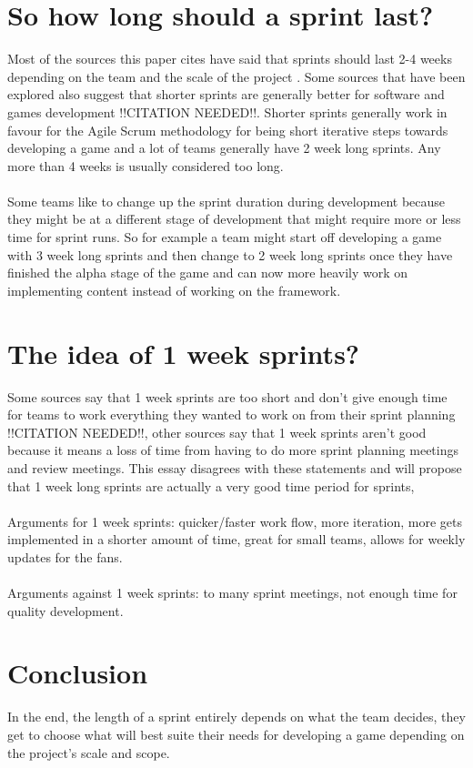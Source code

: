 \documentclass{scrartcl}
\begin{document}
\section{So how long should a sprint last?}
Most of the sources this paper cites have said that sprints should last 2-4 weeks depending on the team and the scale of the project \cite{two} \cite{three} \cite{four} \cite{five}. Some sources that have been explored also suggest that shorter sprints are generally better for software and games development !!CITATION NEEDED!!. Shorter sprints generally work in favour for the Agile Scrum methodology for being short iterative steps towards developing a game and a lot of teams generally have 2 week long sprints. Any more than 4 weeks is usually considered too long.
\\~\\
Some teams like to change up the sprint duration during development because they might be at a different stage of development that might require more or less time for sprint runs. So for example a team might start off developing a game with 3 week long sprints and then change to 2 week long sprints once they have finished the alpha stage of the game and can now more heavily work on implementing content instead of working on the framework.

\section{The idea of 1 week sprints?}
Some sources say that 1 week sprints are too short and don't give enough time for teams to work everything they wanted to work on from their sprint planning !!CITATION NEEDED!!, other sources say that 1 week sprints aren't good because it means a loss of time from having to do more sprint planning meetings and review meetings. This essay disagrees with these statements and will propose that 1 week long sprints are actually a very good time period for sprints,
\\~\\
Arguments for 1 week sprints: quicker/faster work flow, more iteration, more gets implemented in a shorter amount of time, great for small teams, allows for weekly updates for the fans.
\\~\\
Arguments against 1 week sprints: to many sprint meetings, not enough time for quality development.

\section{Conclusion}
\iffalse
Write your conclusion here. The conclusion should do more than summarise the essay, making clear the contribution of the work and highlighting key points, limitations, and outstanding questions. It should not introduce any new content or information.
\fi
In the end, the length of a sprint entirely depends on what the team decides, they get to choose what will best suite their needs for developing a game depending on the project's scale and scope.


\end{document}
